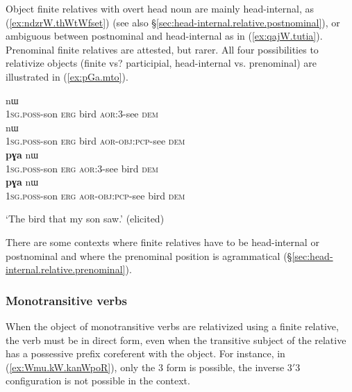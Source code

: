 Object finite relatives with overt head noun are mainly head-internal, as (\ref{ex:ndzrW.thWtWfset}) (see also §\ref{sec:head-internal.relative.postnominal}), or ambiguous between postnominal and head-internal as in (\ref{ex:qajW.tutia}). Prenominal finite relatives are attested, but rarer. All four possibilities to relativize objects (finite vs? participial, head-internal vs. prenominal) are illustrated in (\ref{ex:pGa.mto}).

\begin{exe}
\ex \label{ex:pGa.mto}
\begin{xlist}
\ex \label{ex:pGa.pamto}
 nɯ \\
\textsc{1sg}.\textsc{poss}-son \textsc{erg} bird \textsc{aor}:3\flobv{}-see \textsc{dem} \\
\ex \label{ex:pGa.pWkAmto}
 nɯ \\
\textsc{1sg}.\textsc{poss}-son \textsc{erg} bird \textsc{aor}-\textsc{obj}:\textsc{pcp}-see \textsc{dem} \\
\ex \label{ex:pamto.pGa}
 \textbf{pɣa} nɯ \\
\textsc{1sg}.\textsc{poss}-son \textsc{erg}  \textsc{aor}:3\flobv{}-see bird \textsc{dem} \\
\ex \label{ex:pWkAmto.pGa}
 \textbf{pɣa} nɯ \\
\textsc{1sg}.\textsc{poss}-son \textsc{erg}  \textsc{aor}-\textsc{obj}:\textsc{pcp}-see bird \textsc{dem} \\
\end{xlist}
\glt `The bird that my son saw.' (elicited)
\end{exe}

There are some contexts where finite relatives have to be head-internal or postnominal and where the prenominal position is agrammatical (§\ref{sec:head-internal.relative.prenominal}). 


\subsubsection{Monotransitive verbs} \label{sec:monotransitive.object.relativization}
When the object of monotransitive verbs are relativized using a finite relative, the verb must be in direct form, even when the transitive subject of the relative has a possessive prefix coreferent with the object. For instance, in (\ref{ex:Wmu.kW.kanWpoR}), only the 3\flobv{} form  is possible, the inverse 3$'$\fl{}3 configuration  is not possible in the context. 

